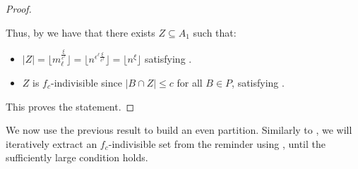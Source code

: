 \begin{lemma}
\begin{proof}
\begin{itemize}
                \end{itemize}
                Thus, by  we have that there exists $Z \subseteq A_1$ such that:
                \begin{itemize}
                    \item $|Z| = \lfloor m_\ell^{\frac{\xi}{\epsilon^\ell}} \rfloor = \lfloor n^{\epsilon^\ell \frac{\xi}{\epsilon^\ell}} \rfloor
                        = \lfloor n^\xi \rfloor$ satisfying .
                    \item $Z$ is $f_c$-indivisible since $|B \cap Z| \leq c$ for all $B \in P$,
                        satisfying .
                \end{itemize}
                This proves the statement.
            \end{proof}
        \end{lemma}

        We now use the previous result to build an even partition.
        Similarly to , we will iteratively extract an $f_c$-indivisible
        set from the reminder using , until
        the sufficiently large condition holds.

